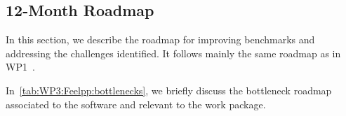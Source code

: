 \subsection{12-Month Roadmap}
\label{sec:WP3:Feelpp:roadmap}

In this section, we describe the roadmap for improving benchmarks and addressing the challenges identified.
It follows mainly the same roadmap as in WP1~.

In~\cref{tab:WP3:Feelpp:bottlenecks}, we briefly discuss the bottleneck roadmap associated to the software and relevant to the work package.


